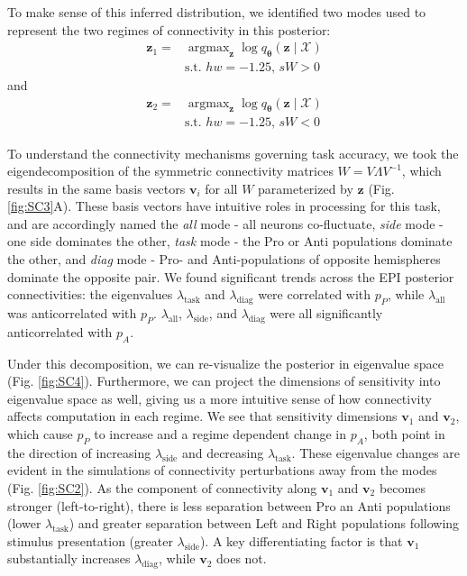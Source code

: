 \documentclass[11pt]{article}
\DeclareMathOperator*{\argmax}{argmax}
\begin{document}
To make sense of this inferred distribution, we identified two modes used to represent the two regimes of connectivity in this posterior:
\begin{equation}
\begin{split}
\mathbf{z}_1 = &\argmax_{\mathbf{z}} \log q_{\bm{\theta}}(\mathbf{z} \mid \mathcal{X}) \\
&\text{s.t. }  hw = -1.25\text{, }  sW > 0
\end{split}
\end{equation}
and 
\begin{equation}
\begin{split}
\mathbf{z}_2 = &\argmax_{\mathbf{z}} \log q_{\bm{\theta}}(\mathbf{z} \mid \mathcal{X}) \\
&\text{s.t. } hw = -1.25\text{, } sW < 0
\end{split}
\end{equation}

To understand the connectivity mechanisms governing task accuracy, we took the eigendecomposition of the symmetric connectivity matrices $W = V\Lambda V^{-1}$, which results in the same basis vectors $\mathbf{v}_i$ for all $W$ parameterized by $\mathbf{z}$ (Fig. \ref{fig:SC3}A). 
These basis vectors have intuitive roles in processing for this task, and are accordingly named the \textit{all} mode - all neurons co-fluctuate, \textit{side} mode - one side dominates the other, \textit{task} mode - the Pro or Anti populations dominate the other, and \textit{diag} mode - Pro- and Anti-populations of opposite hemispheres dominate the opposite pair. 
We found significant trends across the EPI posterior connectivities: the eigenvalues $\lambda_{\text{task}}$ and $\lambda_{\text{diag}}$ were correlated with $p_P$, while $\lambda_{\text{all}}$ was anticorrelated with $p_P$.
$\lambda_{\text{all}}$, $\lambda_{\text{side}}$, and $\lambda_{\text{diag}}$ were all significantly anticorrelated with $p_A$.

Under this decomposition, we can re-visualize the posterior in eigenvalue space (Fig. \ref{fig:SC4}).
Furthermore, we can project the dimensions of sensitivity into eigenvalue space as well, giving us a more intuitive sense of how connectivity affects computation in each regime.
We see that sensitivity dimensions $\mathbf{v}_1$ and $\mathbf{v}_2$, which cause $p_P$ to increase and a regime dependent change in $p_A$, both point in the direction of increasing $\lambda_{\text{side}}$ and decreasing $\lambda_{\text{task}}$.
These eigenvalue changes are evident in the simulations of connectivity perturbations away from the modes (Fig. \ref{fig:SC2}).
As the component of connectivity along $\mathbf{v}_1$ and $\mathbf{v}_2$ becomes stronger (left-to-right), there is less separation between Pro an Anti populations (lower $\lambda_{\text{task}}$) and greater separation between Left and Right populations following stimulus presentation (greater $\lambda_{\text{side}}$).
A key differentiating factor is that $\mathbf{v}_1$ substantially increases $\lambda_{\text{diag}}$, while $\mathbf{v}_2$ does not.
\end{document}
